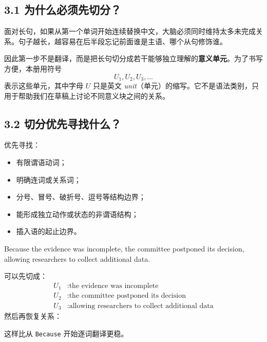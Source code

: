 \documentclass[11pt,a4paper]{ctexart}
\newcommand{\kw}[1]{\textbf{#1}}
\begin{document}
\subsection{3.1 为什么必须先切分？}
面对长句，如果从第一个单词开始连续替换中文，大脑必须同时维持太多未完成关系。句子越长，越容易在后半段忘记前面谁是主语、哪个从句修饰谁。

因此第一步不是翻译，而是把长句切分成若干能够独立理解的\kw{意义单元}。为了书写方便，本册用符号
\[
U_1,U_2,U_3,\ldots
\]
表示这些单元，其中字母 $U$ 只是英文 \textit{unit}（单元）的缩写。它不是语法类别，只用于帮助我们在草稿上讨论不同意义块之间的关系。

\subsection{3.2 切分优先寻找什么？}
优先寻找：
\begin{itemize}
  \item 有限谓语动词；
  \item 明确连词或关系词；
  \item 分号、冒号、破折号、逗号等结构边界；
  \item 能形成独立动作或状态的非谓语结构；
  \item 插入语的起止边界。
\end{itemize}

\begin{eng}
Because the evidence was incomplete, the committee postponed its decision, allowing researchers to collect additional data.
\end{eng}
可以先切成：
\[
\begin{aligned}
U_1 &: \text{the evidence was incomplete}\\
U_2 &: \text{the committee postponed its decision}\\
U_3 &: \text{allowing researchers to collect additional data}
\end{aligned}
\]
然后再恢复关系：
\begin{center}
\end{center}
这样比从 \texttt{Because} 开始逐词翻译更稳。
\end{document}
